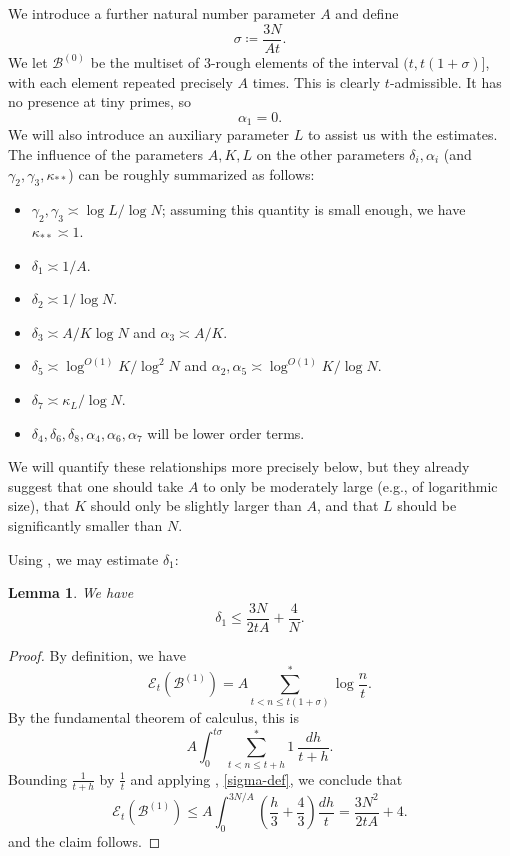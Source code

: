 \documentclass[12pt,a4paper,reqno]{amsart}
\numberwithin{equation}{section}
\theoremstyle{plain}
\newtheorem{lemma}[theorem]{Lemma}
\theoremstyle{definition}
\newcommand\tuple{{\mathcal B}}
\newcommand\excess{{\mathcal{E}}}
\begin{document}
We introduce a further natural number parameter $A$ and define 
\begin{equation}\label{sigma-def}
  \sigma \coloneqq \frac{3N}{At}.
\end{equation}
We let $\tuple^{(0)}$ be the multiset of $3$-rough elements of the interval $(t, t(1+\sigma)]$, with each element repeated precisely $A$ times.  This is clearly $t$-admissible.  It has no presence at tiny primes, so
\begin{equation}\label{alpha1-vanish}
  \alpha_1 = 0.
\end{equation}
We will also introduce an auxiliary parameter $L$ to assist us with the estimates.  The influence of the parameters $A,K,L$ on the other parameters $\delta_i, \alpha_i$ (and $\gamma_2,\gamma_3,\kappa_{**}$) can be roughly summarized as follows:
\begin{itemize}
\item $\gamma_2, \gamma_3 \asymp \log L / \log N$; assuming this quantity is small enough, we have $\kappa_{**} \asymp 1$.
\item $\delta_1 \asymp 1/A$.
\item $\delta_2 \asymp 1/\log N$.
\item $\delta_3 \asymp A/K\log N$ and $\alpha_3 \asymp A/K$.
\item $\delta_5 \asymp \log^{O(1)} K/\log^2 N$ and $\alpha_2, \alpha_5 \asymp \log^{O(1)} K / \log N$.
\item $\delta_7 \asymp \kappa_L/\log N$.
\item $\delta_4, \delta_6, \delta_8, \alpha_4, \alpha_6, \alpha_7$ will be lower order terms.
\end{itemize}
We will quantify these relationships more precisely below, but they already suggest that one should take $A$ to only be moderately large (e.g., of logarithmic size), that $K$ should only be slightly larger than $A$, and that $L$ should be significantly smaller than $N$.

Using , we may estimate $\delta_1$:

\begin{lemma}\label{delta1-bound} We have
$$ \delta_1 \leq \frac{3N}{2tA} + \frac{4}{N}.$$
\end{lemma}

\begin{proof}  By definition, we have
$$ \excess_t(\tuple^{(1)}) = A \sum^*_{t < n \leq t(1+\sigma)} \log \frac{n}{t}.$$
By the fundamental theorem of calculus, this is
$$ A \int_0^{t\sigma} \sum^*_{t < n \leq t+h} 1\ \frac{dh}{t+h}.$$
Bounding $\frac{1}{t+h}$ by $\frac{1}{t}$ and applying , \eqref{sigma-def}, we conclude that
$$
 \excess_t(\tuple^{(1)}) \leq A \int_0^{3N/A} \left(\frac{h}{3} + \frac{4}{3}\right) \frac{dh}{t} = \frac{3N^2}{2tA} + 4.
$$
and the claim follows.
\end{proof}
\end{document}
